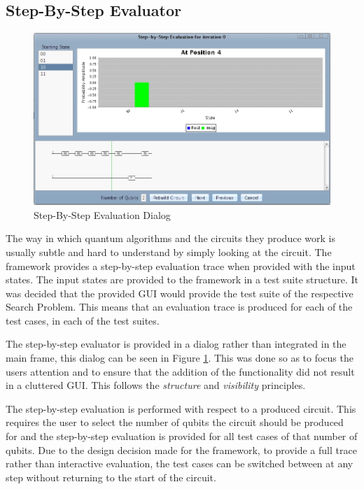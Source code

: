 \subsection{Step-By-Step Evaluator}


\begin{figure}
 \includegraphics[width=\textwidth]{StepByStepEval.jpg}
\caption{Step-By-Step Evaluation Dialog}
\label{fig:StepByStepEval}
\end{figure}
The way in which quantum algorithms and the circuits they produce work is usually subtle and hard to understand by simply looking at the circuit.
The framework provides a step-by-step evaluation trace when provided with the input states.
The input states are provided to the framework in a test suite structure.
It was decided that the provided GUI would provide the test suite of the respective Search Problem.
This means that an evaluation trace is produced for each of the test cases, in each of the test suites.

The step-by-step evaluator is provided in a dialog rather than integrated in the main frame, this dialog can be seen in Figure \ref{fig:StepByStepEval}.
This was done so as to focus the users attention and to ensure that the addition of the functionality did not result in a cluttered GUI.
This follows the \emph{structure} and \emph{visibility} principles.

The step-by-step evaluation is performed with respect to a produced circuit.
This requires the user to select the number of qubits the circuit should be produced for and the step-by-step evaluation is provided for all test cases of that number of qubits.
Due to the design decision made for the framework, to provide a full trace rather than interactive evaluation, the test cases can be switched between at any step without returning to the start of the circuit.


